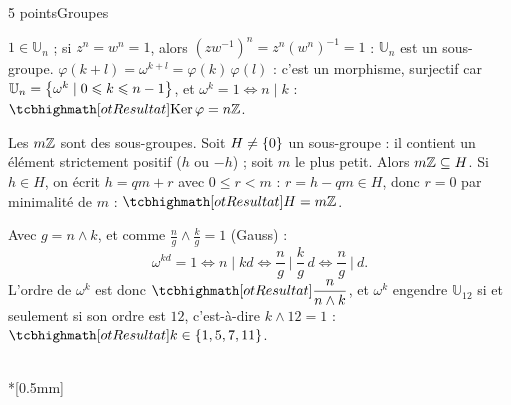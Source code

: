\begin{corrigeEval}{5 points}{Groupes}
\begin{questions}
  \item $1\in\mathbb{U}_n$ ; si $z^{n}=w^{n}=1$, alors
    $(zw^{-1})^{n}=z^{n}(w^{n})^{-1}=1$ : $\mathbb{U}_n$ est un sous-groupe.
    $\varphi(k+l)=\omega^{k+l}=\varphi(k)\,\varphi(l)$ : c'est un morphisme,
    surjectif car $\mathbb{U}_n=\left\{\omega^{k}\mid0\leqslant k\leqslant n-1\right\}$,
    et $\omega^{k}=1\iff n\mid k$ : $\res{\operatorname{Ker}\varphi=n\Z}$.
  \item Les $m\mathbb{Z}$ sont des sous-groupes. Soit $H\neq\left\{0\right\}$ un sous-groupe :
    il contient un élément strictement positif ($h$ ou $-h$) ; soit $m$ le
    plus petit. Alors $m\mathbb{Z}\subseteq H$. Si $h\in H$, on écrit $h=qm+r$ avec
    $0\leqslant r<m$ : $r=h-qm\in H$, donc $r=0$ par minimalité de $m$ :
    $\res{H=m\Z}$. 
  \item Avec $g=n\wedge k$, et comme $\frac ng\wedge\frac kg=1$ (Gauss) :
    \[\omega^{kd}=1\iff n\mid kd\iff\frac ng\ \Big|\ \frac kg\,d\iff\frac ng\ \Big|\ d.\]
    L'ordre de $\omega^{k}$ est donc $\res{\dfrac{n}{n\wedge k}}$, et
    $\omega^{k}$ engendre $\mathbb{U}_{12}$ si et seulement si son ordre est
    $12$, c'est-à-dire $k\wedge12=1$ : $\res{k\in\ens{1,5,7,11}}$.
\end{questions}
\begin{center}\begin{minipage}{\linewidth}\centering
{}\\*[0.5mm]
\end{minipage}\end{center}
\end{corrigeEval}

